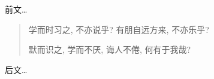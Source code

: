 \documentclass[nofonts]{ctexart}
\begin{document}
\noindent
前文\ldots 
\begin{quotation}
	学而时习之, 不亦说乎?
	有朋自远方来, 不亦乐乎?

	默而识之, 学而不厌, 诲人不倦, 何有于我哉?
\end{quotation}
后文\ldots
\end{document}
